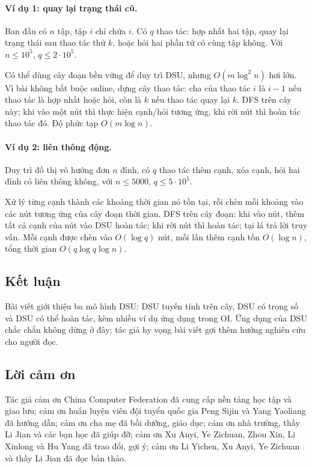 \documentclass[11pt]{article}
\begin{document}
\paragraph{Ví dụ 1: quay lại trạng thái cũ.}
Ban đầu có \(n\) tập, tập \(i\) chỉ chứa \(i\). Có \(q\) thao tác: hợp nhất hai
tập, quay lại trạng thái sau thao tác thứ \(k\), hoặc hỏi hai phần tử có cùng
tập không. Với \(n\le 10^5\), \(q\le 2\cdot 10^5\).

Có thể dùng cây đoạn bền vững để duy trì DSU, nhưng \(O(m\log^2 n)\) hơi lớn.
Vì bài không bắt buộc online, dựng cây thao tác: cha của thao tác \(i\) là
\(i-1\) nếu thao tác là hợp nhất hoặc hỏi, còn là \(k\) nếu thao tác quay lại
\(k\). DFS trên cây này; khi vào một nút thì thực hiện cạnh/hỏi tương ứng, khi
rời nút thì hoàn tác thao tác đó. Độ phức tạp \(O(m\log n)\).

\paragraph{Ví dụ 2: liên thông động.}
Duy trì đồ thị vô hướng đơn \(n\) đỉnh, có \(q\) thao tác thêm cạnh, xóa cạnh,
hỏi hai đỉnh có liên thông không, với \(n\le 5000\), \(q\le 5\cdot 10^5\).

Xử lý từng cạnh thành các khoảng thời gian nó tồn tại, rồi chèn mỗi khoảng vào
các nút tương ứng của cây đoạn thời gian. DFS trên cây đoạn: khi vào nút, thêm
tất cả cạnh của nút vào DSU hoàn tác; khi rời nút thì hoàn tác; tại lá trả lời
truy vấn. Mỗi cạnh được chèn vào \(O(\log q)\) nút, mỗi lần thêm cạnh tốn
\(O(\log n)\), tổng thời gian \(O(q\log q\log n)\).

\subsection{Kết luận}

Bài viết giới thiệu ba mô hình DSU: DSU tuyến tính trên cây, DSU có trọng số và
DSU có thể hoàn tác, kèm nhiều ví dụ ứng dụng trong OI. Ứng dụng của DSU chắc
chắn không dừng ở đây; tác giả hy vọng bài viết gợi thêm hướng nghiên cứu cho
người đọc.

\subsection{Lời cảm ơn}

Tác giả cảm ơn China Computer Federation đã cung cấp nền tảng học tập và giao
lưu; cảm ơn huấn luyện viên đội tuyển quốc gia Peng Sijin và Yang Yaoliang đã
hướng dẫn; cảm ơn cha mẹ đã bồi dưỡng, giáo dục; cảm ơn nhà trường, thầy Li
Jian và các bạn học đã giúp đỡ; cảm ơn Xu Anyi, Ye Zichuan, Zhou Xin, Li
Xinlong và Hu Yang đã trao đổi, gợi ý; cảm ơn Li Yichen, Xu Anyi, Ye Zichuan
và thầy Li Jian đã đọc bản thảo.
\end{document}
